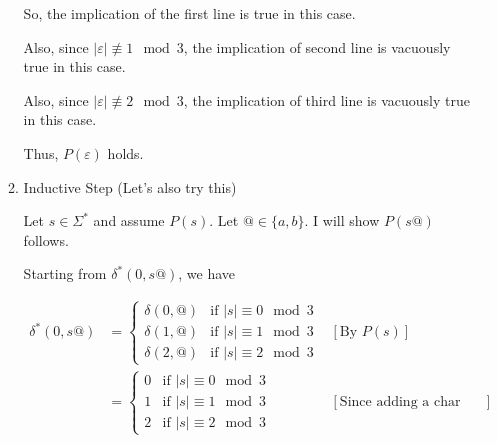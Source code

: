 \documentclass[12pt]{article}
\begin{document}
\begin{enumerate}[1.]
\begin{enumerate}[1.]
\begin{mdframed}
        \bigskip

        So, the implication of the first line is true in this case.

        \bigskip

        Also, since $\vert \varepsilon \vert \not\equiv 1 \mod 3$, the implication
        of second line is vacuously true in this case.

        \bigskip

        Also, since $\vert \varepsilon \vert \not\equiv 2 \mod 3$, the implication
        of third line is vacuously true in this case.

        \bigskip

        Thus, $P(\varepsilon)$ holds.

        \end{mdframed}

        \item Inductive Step (Let's also try this)

        \begin{mdframed}

            Let $s \in \Sigma^*$ and assume $P(s)$. Let $@ \in \{a,b\}$. I will
            show $P(s@)$ follows.

            \bigskip

            Starting from $\delta^*(0,s@)$, we have

            \begin{align}
            \delta^*(0,s@) &= \begin{cases}
                \delta(0,@) & \text{if $\vert s \vert \equiv 0 \mod 3$}\\
                \delta(1,@) & \text{if $\vert s \vert \equiv 1 \mod 3$}\\
                \delta(2,@) & \text{if $\vert s \vert \equiv 2 \mod 3$}
            \end{cases} & [\text{By $P(s)$}]\\
            &= \begin{cases}
                0 & \text{if $\vert s \vert \equiv 0 \mod 3$}\\
                1 & \text{if $\vert s \vert \equiv 1 \mod 3$}\\
                2 & \text{if $\vert s \vert \equiv 2 \mod 3$}
            \end{cases} & [\text{Since adding a char doesn't change inv. cond.}]\\
            \end{align}


\end{mdframed}
\end{enumerate}
\end{enumerate}
\end{document}
